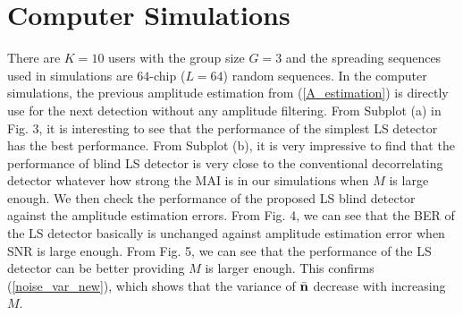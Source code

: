 \documentclass[a4paper,10pt,fleqn, twocolumn]{IEEETran}
\newcommand{\bn}{{\bf n}}
\begin{document}
\section{Computer Simulations}
There are $K=10$ users with the group size $G=3$ and the spreading
sequences used in simulations are $64$-chip ($L=64$) random
sequences. In the computer simulations, the previous amplitude
estimation from (\ref{A_estimation}) is directly use for the next
detection without any amplitude filtering. From Subplot (a) in
Fig. 3, it is interesting to see that the performance of the
simplest LS detector has the best performance. From Subplot (b),
it is very impressive to find that the performance of blind LS
detector is very close to the conventional decorrelating detector
whatever how strong the MAI is in our simulations when $M$ is
large enough. We then check the performance of the proposed LS
blind detector against the amplitude estimation errors. From Fig.
4, we can see that the BER of the LS detector basically is
unchanged against amplitude estimation error when SNR is large
enough. From Fig. 5, we can see that the performance of the LS
detector can be better providing $M$ is larger enough. This
confirms (\ref{noise_var_new}), which shows that the variance of
$\bar{\bn}$ decrease with increasing $M$.
\begin{figure} \label{BER_SNR}
\end{figure}
\begin{figure} \label{BER_A_SNR}
\end{figure}
\end{document}
